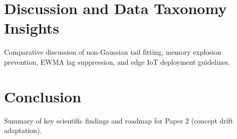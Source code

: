 \documentclass[a4paper,fleqn]{cas-sc}
\begin{document}
\section{Discussion and Data Taxonomy Insights}\label{sec6_discussion}
Comparative discussion of non-Gaussian tail fitting, memory explosion prevention, EWMA lag suppression, and edge IoT deployment guidelines.


\section{Conclusion}\label{sec7_conclusion}
Summary of key scientific findings and roadmap for Paper 2 (concept drift adaptation).



\end{document}
